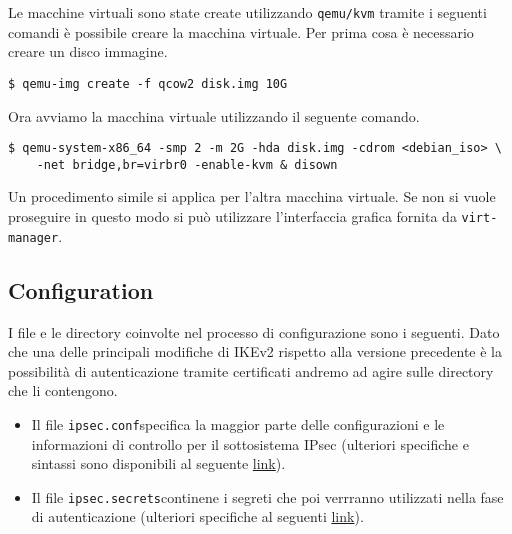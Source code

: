 \documentclass[
10pt, %
a4paper, %
oneside, %
headinclude,footinclude, %
BCOR5mm, %
]{scrartcl}
\begin{document}
\noindent
Le macchine virtuali sono state create utilizzando \lstinline|qemu/kvm| tramite i seguenti comandi è possibile creare la macchina virtuale.
\newline\newline\noindent
Per prima cosa è necessario creare un disco immagine.
\begin{lstlisting}
$ qemu-img create -f qcow2 disk.img 10G 
\end{lstlisting}
\vspace*{0.2cm}
Ora avviamo la macchina virtuale utilizzando il seguente comando.
\begin{lstlisting}
$ qemu-system-x86_64 -smp 2 -m 2G -hda disk.img -cdrom <debian_iso> \
    -net bridge,br=virbr0 -enable-kvm & disown
\end{lstlisting}

\vspace*{0.5cm}
\noindent
Un procedimento simile si applica per l'altra macchina virtuale. Se non si vuole proseguire in questo modo 
si può utilizzare l'interfaccia grafica fornita da \lstinline|virt-manager|.



\subsection{Configuration} 

I file e le directory coinvolte nel processo di configurazione sono i seguenti. Dato che una delle principali modifiche di IKEv2 
rispetto alla versione precedente è la possibilità di autenticazione tramite certificati andremo ad agire sulle directory che li contengono.
\\

    
\begin{itemize}
    \item Il file \lstinline|ipsec.conf|\footnotemark[1] specifica la maggior parte delle configurazioni e le informazioni di controllo per il sottosistema IPsec (ulteriori specifiche e sintassi sono disponibili al seguente \href{https://linux.die.net/man/5/ipsec.conf}{link}).
    \item Il file \lstinline|ipsec.secrets|\footnotemark[1] continene i segreti che poi verrranno utilizzati nella fase di autenticazione (ulteriori specifiche al seguenti \href{https://linux.die.net/man/5/ipsec.secrets}{link}).
\end{itemize}
\end{document}
